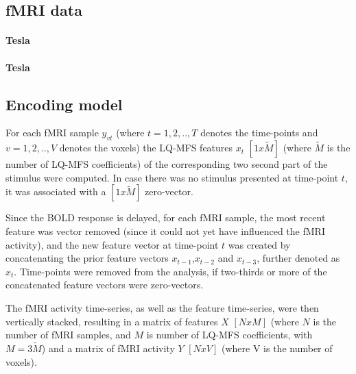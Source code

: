 \cite{HBI+14,HDH+2015}

\subsection*{fMRI data}

\paragraph{\unit[3]{Tesla}}
\paragraph{\unit[7]{Tesla}}

\subsection*{Encoding model}




For each f{MRI} sample $y_{vt}$ (where $t=1,2,..,T$ denotes the time-points and $v=1,2,..,V$ denotes the voxels) the LQ-MFS features $x_{t}$ $[1x\widetilde{M}]$ (where $\widetilde{M}$ is the number of LQ-MFS coefficients) of the corresponding two second part of the stimulus were computed. In case there was no stimulus presented at time-point $t$, it was associated with a $[1x\widetilde{M}]$ zero-vector. 

Since the BOLD response is delayed, for each f{MRI} sample, the most recent feature was vector removed (since it could not yet have influenced the f{MRI} activity), and the new feature vector at time-point $t$ was created by concatenating the prior feature vectors $x_{t-1}$,$x_{t-2}$ and $x_{t-3}$, further denoted as $x_{t}$. Time-points were removed from the analysis, if two-thirds or more of the concatenated feature vectors were zero-vectors.

The f{MRI} activity time-series, as well as the feature time-series, were then vertically stacked, resulting in a matrix of features $X$ $[NxM]$ (where $N$ is the number of f{MRI} samples, and $M$ is number of LQ-MFS coefficients, with $M=3\widetilde{M}$) and a matrix of f{MRI} activity $Y$ $[NxV]$ (where V is the number of voxels).

